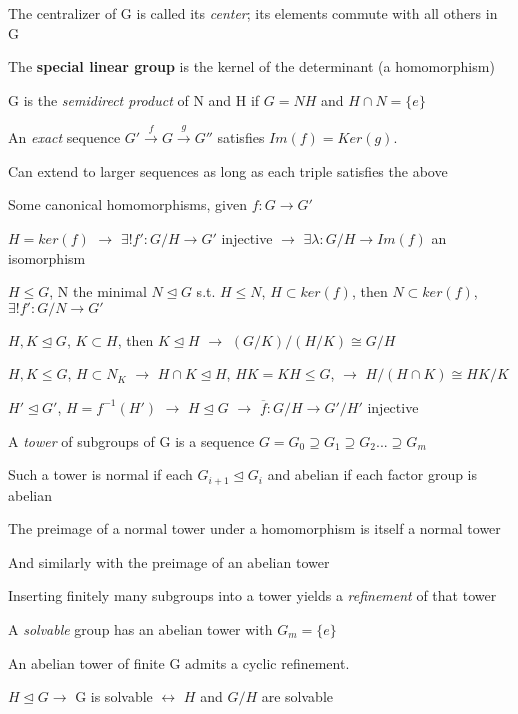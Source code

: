 \documentclass[12pt]{article}
\begin{document}
The centralizer of G is called its \textit{center}; its elements commute with all others in G

\noindent
The \textbf{special linear group} is the kernel of the determinant (a homomorphism)

\noindent
G is the \textit{semidirect product} of N and H if $G=NH$ and $H\cap N = \{e\}$

\noindent
An \textit{exact} sequence $G' \xrightarrow{f} G \xrightarrow{g} G''$ satisfies $Im(f) = Ker(g)$.

Can extend to larger sequences as long as each triple satisfies the above

\noindent
Some canonical homomorphisms, given $f: G \to G'$

$H = ker(f)$ $\to$ $\exists !f': G\slash H \to G'$ injective $\to$ $\exists\lambda: G\slash H \to Im(f)$ an isomorphism

$H \leq G$, N the minimal $N \trianglelefteq G$ s.t. $H \leq N$, $H \subset ker(f)$, then $N \subset ker(f)$, $\exists ! f': G\slash N \to G'$

$H, K \trianglelefteq G$, $K \subset H$, then $K \trianglelefteq H$ $\to$ $(G\slash K)\slash (H \slash K) \cong G \slash H$

$H, K \leq G$, $H \subset N_K$ $\to$ $H \cap K \trianglelefteq H$, $HK = KH \leq G$, $\to$ $H\slash(H\cap K) \cong HK\slash K$

$H' \trianglelefteq G'$, $H = f^{-1}(H')$ $\to$ $H \trianglelefteq G$ $\to$ $\overline{f}: G\slash H \to G'\slash H'$ injective

\noindent
A \textit{tower} of subgroups of G is a sequence $G = G_0 \supseteq G_1 \supseteq G_2 ... \supseteq G_m$

Such a tower is normal if each $G_{i+1} \trianglelefteq G_i$ and abelian if each factor group is abelian

The preimage of a normal tower under a homomorphism is itself a normal tower

And similarly with the preimage of an abelian tower

Inserting finitely many subgroups into a tower yields a \textit{refinement} of that tower

A \textit{solvable} group has an abelian tower with $G_m = \{e\}$

\noindent
An abelian tower of finite G admits a cyclic refinement.

\noindent
$H \trianglelefteq G \to$ G is solvable $\leftrightarrow$ $H$ and $G\slash H$ are solvable
\end{document}
